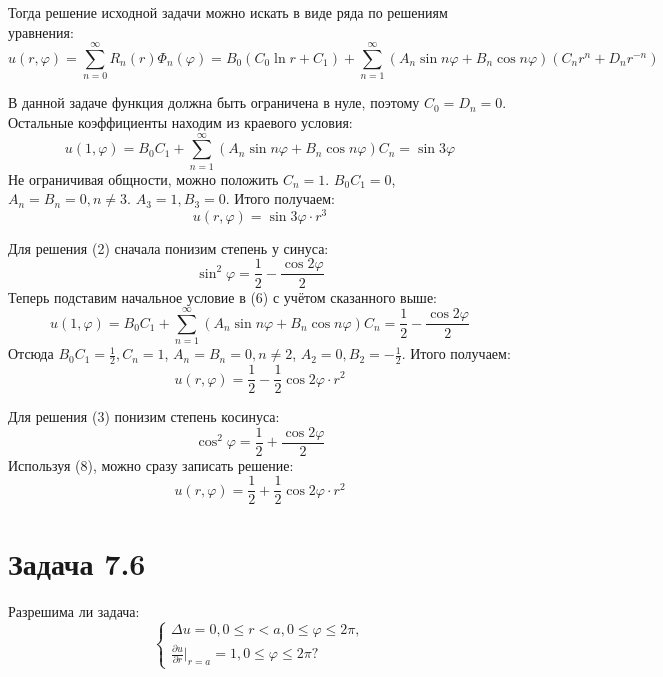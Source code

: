 \documentclass[11pt]{article}
\begin{document}
Тогда решение исходной задачи можно искать в виде ряда по решениям уравнения:
\begin{equation}
u(r, \varphi) = \sum_{n = 0}^{\infty}R_n(r)\Phi_n(\varphi) = B_0(C_0\ln r + C_1) +
\sum_{n = 1}^{\infty}(A_n\sin n\varphi + B_n\cos n\varphi)\left(C_nr^n + D_nr^{-n}\right)
\end{equation}

В данной задаче функция должна быть ограничена в нуле, поэтому $C_0 = D_n = 0$. Остальные
коэффициенты находим из краевого условия:
\begin{equation*}
u(1, \varphi) = B_0C_1 + \sum_{n = 1}^{\infty}(A_n\sin n\varphi + B_n\cos n\varphi)C_n = \sin3\varphi
\end{equation*}
Не ограничивая общности, можно положить $C_n = 1$. $B_0C_1 = 0$, $A_n = B_n = 0, n \neq 3$.
$A_3 = 1, B_3 = 0$. Итого получаем:
\begin{equation}
u(r, \varphi) = \sin3\varphi \cdot r^3
\end{equation}

Для решения (2) сначала понизим степень у синуса:
\begin{equation*}
\sin^2\varphi = \frac12 - \frac{\cos2\varphi}2
\end{equation*}
Теперь подставим начальное условие в (6) с учётом сказанного выше:
\begin{equation*}
u(1, \varphi) = B_0C_1 + \sum_{n = 1}^{\infty}(A_n\sin n\varphi + B_n\cos n\varphi)C_n = \frac12 - \frac{\cos2\varphi}2
\end{equation*}
Отсюда $B_0C_1 = \frac12, C_n = 1$, $A_n = B_n = 0, n \neq 2$, $A_2 = 0, B_2 = -\frac12$. Итого получаем:
\begin{equation}
u(r, \varphi) = \frac12 - \frac12\cos2\varphi\cdot r^2
\end{equation}

Для решения (3) понизим степень косинуса:
\begin{equation*}
\cos^2\varphi = \frac12 + \frac{\cos2\varphi}2
\end{equation*}
Используя (8), можно сразу записать решение:
\begin{equation}
u(r, \varphi) = \frac12 + \frac12\cos2\varphi\cdot r^2
\end{equation}
\section{Задача 7.6}
\label{sec:org2ebdbe7}
Разрешима ли задача:
\begin{equation}
\begin{cases}
\Delta u = 0, 0 \leq r < a, 0 \leq \varphi \leq 2\pi, \\
\frac{\partial u}{\partial r}\bigg|_{r = a} = 1, 0 \leq \varphi \leq 2\pi?
\end{cases}
\end{equation}
\end{document}
